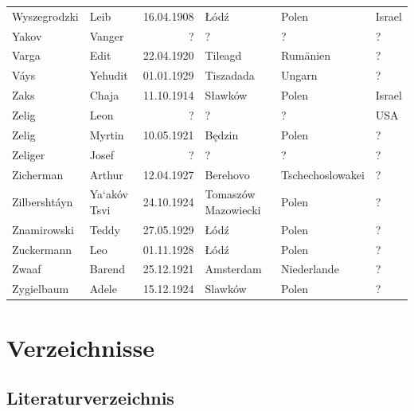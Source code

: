 \documentclass[a4paper,12pt,ngerman,
]{nisebook}
\begin{document}
\begin{tiny}
\begin{longtable}[l]{|l|l|r|l|l|l|}
Wyszegrodzki  &  Leib  &  16.04.1908  &  \L \'od\'z  &  Polen  &  Israel \\[3pt]
Yakov  &  Vanger  &  ?  &  ?  &  ?  &  ? \\[3pt]
Varga  &  Edit  &  22.04.1920  &  Tileagd  &  Rumänien  &   ?  \\[3pt]
Váys  &  Yehudit  &  01.01.1929  &  Tiszadada  &  Ungarn  &   ?  \\[3pt]
Zaks  &  Chaja  &  11.10.1914  &  S\l awk\'ow  &  Polen  &  Israel \\[3pt]
Zelig  &  Leon  &  ?  &  ?  &  ?  &  USA \\[3pt]
Zelig  &  Myrtin  &  10.05.1921  &  Będzin  &  Polen  &  ? \\[3pt]
Zeliger  &  Josef  &  ?  &  ?  &  ?  &  ? \\[3pt]
Zicherman  &  Arthur  &  12.04.1927  &  Berehovo  &  Tschechoslowakei  &   ?  \\[3pt]
Zilbershtáyn  &  Ya`akóv Tsvi  &  24.10.1924  &  Tomaszów Mazowiecki  &  Polen  &   ?  \\[3pt]
Znamirowski  &  Teddy  &  27.05.1929  &  \L \'od\'z  &  Polen  &   ?  \\[3pt]
Zuckermann  &  Leo  &  01.11.1928  &  \L \'od\'z  &  Polen  &   ?  \\[3pt]
Zwaaf  &  Barend  &  25.12.1921  &  Amsterdam  &  Niederlande  &   ?  \\[3pt]
Zygielbaum  &  Adele  &  15.12.1924  &  Slawków  &  Polen  &   ?  \\
\hline
\end{longtable}
\end{tiny}


 






\chapter{Verzeichnisse}
\section*{Literaturverzeichnis}
\end{document}
